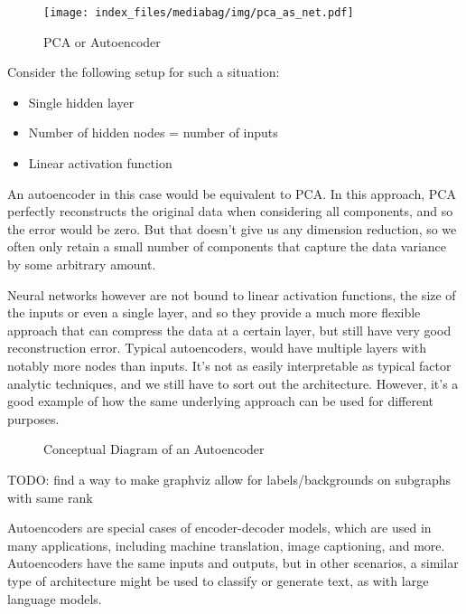 \documentclass[
  letterpaper,
]{krantz}
\providecommand{\tightlist}{%
  \setlength{\itemsep}{0pt}\setlength{\parskip}{0pt}}\usepackage{longtable,booktabs,array}
\begin{document}
\begin{figure}[H]

{\centering \texttt{[image: index\_files/mediabag/img/pca\_as\_net.pdf]}

}

\caption{PCA or Autoencoder}

\end{figure}%

Consider the following setup for such a situation:

\begin{itemize}
\tightlist
\item
  Single hidden layer
\item
  Number of hidden nodes = number of inputs
\item
  Linear activation function
\end{itemize}

An autoencoder in this case would be equivalent to PCA. In this
approach, PCA perfectly reconstructs the original data when considering
all components, and so the error would be zero. But that doesn't give us
any dimension reduction, so we often only retain a small number of
components that capture the data variance by some arbitrary amount.

Neural networks however are not bound to linear activation functions,
the size of the inputs or even a single layer, and so they provide a
much more flexible approach that can compress the data at a certain
layer, but still have very good reconstruction error. Typical
autoencoders, would have multiple layers with notably more nodes than
inputs. It's not as easily interpretable as typical factor analytic
techniques, and we still have to sort out the architecture. However,
it's a good example of how the same underlying approach can be used for
different purposes.

\begin{figure}[H]


\caption{\label{fig-autoencoder}Conceptual Diagram of an Autoencoder}

\end{figure}%

TODO: find a way to make graphviz allow for labels/backgrounds on
subgraphs with same rank

\begin{tcolorbox}[enhanced jigsaw, colframe=quarto-callout-note-color-frame, opacityback=0, breakable, left=2mm, rightrule=.15mm, toprule=.15mm, arc=.35mm, leftrule=.75mm, colback=white, bottomrule=.15mm]

Autoencoders are special cases of encoder-decoder models, which are used
in many applications, including machine translation, image captioning,
and more. Autoencoders have the same inputs and outputs, but in other
scenarios, a similar type of architecture might be used to classify or
generate text, as with large language models.

\end{tcolorbox}
\end{document}
